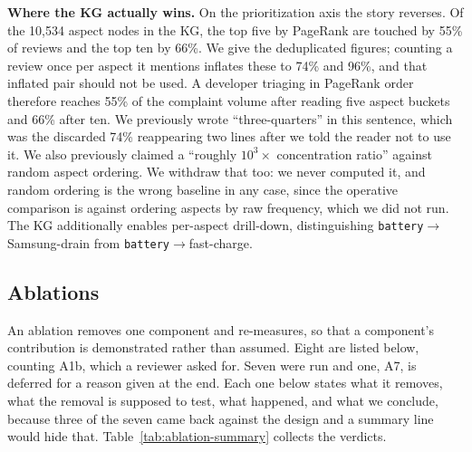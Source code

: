 \documentclass[sigconf, anonymous]{acmart}
\begin{document}
  \textbf{Where the KG actually wins.} On the prioritization axis the story reverses. Of the
  10{,}534 aspect nodes in the KG, the top five by PageRank are touched by 55\% of reviews and
  the top ten by 66\%. We give the deduplicated figures; counting a review once per aspect it
  mentions inflates these to 74\% and 96\%, and that inflated pair should not be used. A developer
  triaging in PageRank order therefore reaches 55\% of the complaint volume after reading five
  aspect buckets and 66\% after ten. We previously wrote ``three-quarters'' in this sentence,
  which was the discarded 74\% reappearing two lines after we told the reader not to use it. We
  also previously claimed a ``roughly $10^3\times$ concentration ratio'' against random aspect
  ordering. We withdraw that too: we never computed it, and random ordering is the wrong baseline
  in any case, since the operative comparison is against ordering aspects by raw frequency, which
  we did not run. The KG additionally enables per-aspect drill-down,
   distinguishing \texttt{battery}$\to$Samsung-drain from \texttt{battery}$\to$fast-charge.

\subsection{Ablations}\label{ablations}

  An ablation removes one component and re-measures, so that a component's contribution is
  demonstrated rather than assumed. Eight are listed below, counting A1b, which a reviewer asked for. Seven were run and one, A7,
  is deferred for a reason given at the end. Each one below states what it removes, what
  the removal is supposed to test, what happened, and what we conclude, because three of the
  seven came back against the design and a summary line would hide that.
  Table~\ref{tab:ablation-summary} collects the verdicts.
\end{document}

